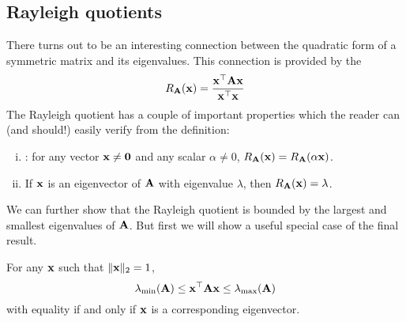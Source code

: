 \subsection{Rayleigh quotients}
There turns out to be an interesting connection between the quadratic form of a symmetric matrix and its eigenvalues.
This connection is provided by the 
\[R_{\mathbf{A}}(\mathbf{x}) = \frac{\mathbf{x}^\top\mathbf{A}\mathbf{x}}{\mathbf{x}^\top\mathbf{x}}\]
The Rayleigh quotient has a couple of important properties which the reader can (and should!) easily verify from the definition:
\begin{enumerate}[(i)]
\item {}: for any vector $\mathbf{x} \neq \mathbf{0}$ and any scalar $\alpha \neq 0$, $R_{\mathbf{A}}(\mathbf{x}) = R_{\mathbf{A}}(\alpha\mathbf{x})$.
\item If $\mathbf{x}$ is an eigenvector of $\mathbf{A}$ with eigenvalue $\lambda$, then $R_{\mathbf{A}}(\mathbf{x}) = \lambda$.
\end{enumerate}
We can further show that the Rayleigh quotient is bounded by the largest and smallest eigenvalues of $\mathbf{A}$.
But first we will show a useful special case of the final result.
\begin{proposition}
For any $\mathbf{x}$ such that $\|\mathbf{x}\|_2 = 1$,
\[\lambda_{\min}(\mathbf{A}) \leq \mathbf{x}^\top\mathbf{A}\mathbf{x} \leq \lambda_{\max}(\mathbf{A})\]
with equality if and only if $\mathbf{x}$ is a corresponding eigenvector.
\end{proposition}
